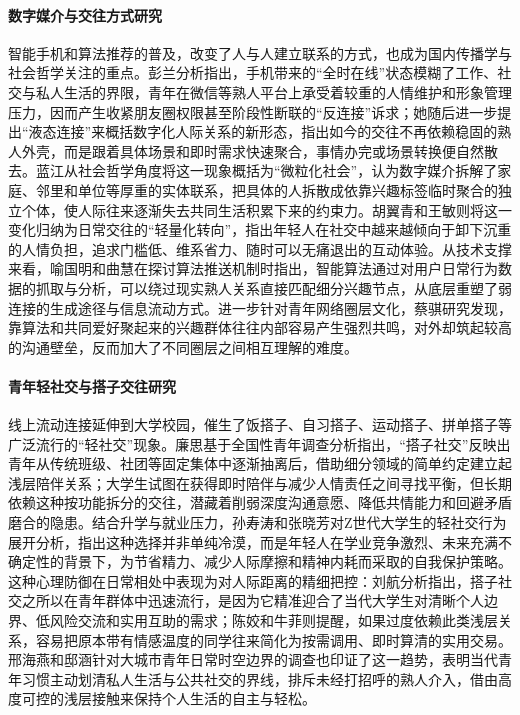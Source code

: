 \paragraph{数字媒介与交往方式研究}
智能手机和算法推荐的普及，改变了人与人建立联系的方式，也成为国内传播学与社会哲学关注的重点。彭兰分析指出，手机带来的“全时在线”状态模糊了工作、社交与私人生活的界限，青年在微信等熟人平台上承受着较重的人情维护和形象管理压力，因而产生收紧朋友圈权限甚至阶段性断联的“反连接”诉求\cite{GJXW201902002}；她随后进一步提出“液态连接”来概括数字化人际关系的新形态，指出如今的交往不再依赖稳固的熟人外壳，而是跟着具体场景和即时需求快速聚合，事情办完或场景转换便自然散去\cite{Peng2021}。蓝江从社会哲学角度将这一现象概括为“微粒化社会”，认为数字媒介拆解了家庭、邻里和单位等厚重的实体联系，把具体的人拆散成依靠兴趣标签临时聚合的独立个体，使人际往来逐渐失去共同生活积累下来的约束力\cite{Lan2022}。胡翼青和王敏则将这一变化归纳为日常交往的“轻量化转向”，指出年轻人在社交中越来越倾向于卸下沉重的人情负担，追求门槛低、维系省力、随时可以无痛退出的互动体验\cite{Hu2019}。从技术支撑来看，喻国明和曲慧在探讨算法推送机制时指出，智能算法通过对用户日常行为数据的抓取与分析，可以绕过现实熟人关系直接匹配细分兴趣节点，从底层重塑了弱连接的生成途径与信息流动方式\cite{XJSF202001015}。进一步针对青年网络圈层文化，蔡骐研究发现，靠算法和共同爱好聚起来的兴趣群体往往内部容易产生强烈共鸣，对外却筑起较高的沟通壁垒，反而加大了不同圈层之间相互理解的难度\cite{Cai2018}。

\paragraph{青年轻社交与搭子交往研究}
线上流动连接延伸到大学校园，催生了饭搭子、自习搭子、运动搭子、拼单搭子等广泛流行的“轻社交”现象。廉思基于全国性青年调查分析指出，“搭子社交”反映出青年从传统班级、社团等固定集体中逐渐抽离后，借助细分领域的简单约定建立起浅层陪伴关系；大学生试图在获得即时陪伴与减少人情责任之间寻找平衡，但长期依赖这种按功能拆分的交往，潜藏着削弱深度沟通意愿、降低共情能力和回避矛盾磨合的隐患\cite{Lian2024a}。结合升学与就业压力，孙寿涛和张晓芳对Z世代大学生的轻社交行为展开分析，指出这种选择并非单纯冷漠，而是年轻人在学业竞争激烈、未来充满不确定性的背景下，为节省精力、减少人际摩擦和精神内耗而采取的自我保护策略\cite{Sun2023}。这种心理防御在日常相处中表现为对人际距离的精细把控：刘航分析指出，搭子社交之所以在青年群体中迅速流行，是因为它精准迎合了当代大学生对清晰个人边界、低风险交流和实用互助的需求\cite{LiuHang2023}；陈姣和牛菲则提醒，如果过度依赖此类浅层关系，容易把原本带有情感温度的同学往来简化为按需调用、即时算清的实用交易\cite{ChenJiao2024}。邢海燕和邸涵针对大城市青年日常时空边界的调查也印证了这一趋势，表明当代青年习惯主动划清私人生活与公共社交的界线，排斥未经打招呼的熟人介入，借由高度可控的浅层接触来保持个人生活的自主与轻松\cite{Xing2022}。

